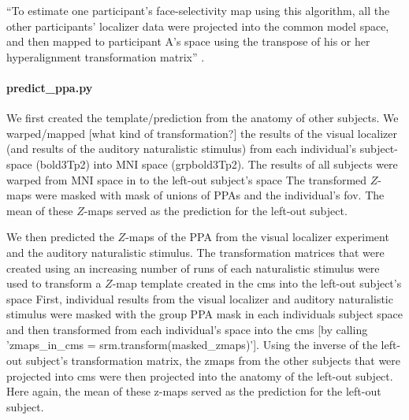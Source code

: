 ``To estimate one participant's face-selectivity map using this algorithm, all
the other participants' localizer data were projected into the common model
space, and then mapped to participant A's space using the transpose of his or
her hyperalignment transformation matrix'' \citep{jiahui2020predicting}.


\paragraph{predict\_ppa.py}



We first created the template/prediction from the anatomy of other subjects.
%
We warped/mapped [what kind of transformation?] the results of the visual
localizer (and results of the auditory naturalistic stimulus) from each
individual's subject-space (bold3Tp2) into MNI space (grpbold3Tp2).
The results of all subjects were warped from MNI space in to the left-out
subject's space
The transformed $Z$-maps were masked with mask of unions of PPAs and the
individual's \ac{fov}.
%
The mean of these $Z$-maps served as the prediction for the left-out subject.

We then predicted the $Z$-maps of the PPA from the visual localizer experiment
and the auditory naturalistic stimulus.
%
The transformation matrices that were created using an increasing number of runs
of each naturalistic stimulus were used to transform a $Z$-map template created
in the \ac{cms} into the left-out subject's space
%
First, individual results from the visual localizer and auditory naturalistic
stimulus were masked with the group PPA mask in each individuals subject space
and then transformed from each individual's space into the \ac{cms} [by calling
'zmaps\_in\_cms = srm.transform(masked\_zmaps)'].
Using the inverse of the left-out subject's transformation matrix, the zmaps
from the other subjects that were projected into \ac{cms} were then projected
into the anatomy of the left-out subject.
%
Here again, the mean of these z-maps served as the prediction for the left-out
subject.

